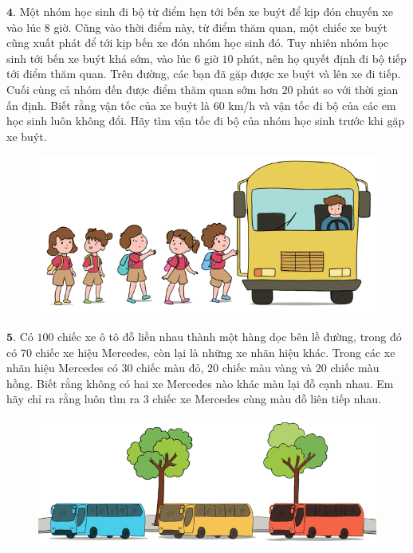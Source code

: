 \begin{multicols}{2}
	$\pmb{4.}$ Một nhóm học sinh đi bộ từ điểm hẹn tới bến xe buýt để kịp đón chuyến xe vào lúc $8$ giờ. Cũng vào thời điểm này, từ điểm thăm quan, một chiếc xe buýt cũng xuất phát để tới kịp bến xe đón nhóm học sinh đó. Tuy  nhiên nhóm học sinh tới bến xe buýt khá sớm, vào lúc $6$ giờ $10$ phút, nên họ quyết định đi bộ tiếp tới điểm thăm quan. Trên đường, các bạn đã gặp được xe buýt và lên xe đi tiếp.  Cuối cùng cả nhóm đến được điểm thăm quan sớm hơn $20$ phút so với thời gian ấn định. Biết rằng vận tốc của xe buýt là $60$ km/h và vận tốc đi bộ của các em học sinh luôn không đổi. Hãy tìm vận tốc đi bộ của nhóm học sinh trước khi gặp xe buýt.
	\begin{figure}[H]
		\centering
		\vspace*{-10pt}
		\captionsetup{labelformat= empty, justification=centering}
		\includegraphics[width=0.85\linewidth]{Pi5_bai4}
		\vspace*{-10pt}
	\end{figure}
	$\pmb{5.}$ 	Có $100$ chiếc xe ô tô đỗ liền nhau thành một hàng dọc bên lề đường, trong đó có $70$ chiếc xe hiệu Mercedes, còn lại là những xe nhãn hiệu khác. Trong các xe nhãn hiệu Mercedes có $30$ chiếc màu đỏ, $20$ chiếc màu vàng và $20$ chiếc màu hồng. Biết rằng không có hai xe Mercedes nào khác màu lại đỗ cạnh nhau. Em hãy chỉ ra rằng luôn tìm ra $3$ chiếc xe Mercedes cùng màu đỗ liên tiếp nhau.
	\begin{figure}[H]
		\centering
		\vspace*{-5pt}
		\captionsetup{labelformat= empty, justification=centering}
		\includegraphics[width=0.85\linewidth]{Pi5_bai5}

\end{figure}
\end{multicols}
